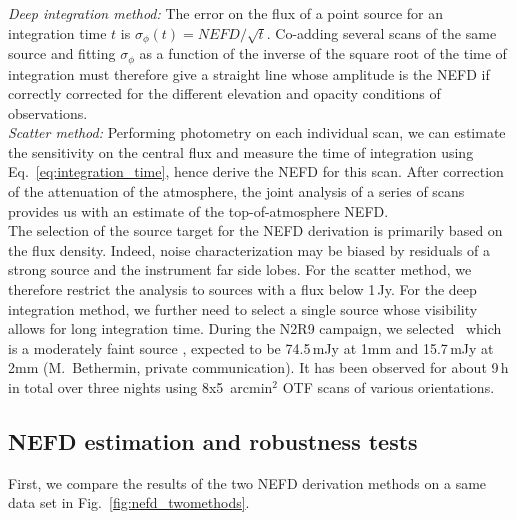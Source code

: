 \noindent \emph{Deep integration method:} The error on the flux of a point source for an
integration time $t$ is $\sigma_\phi(t) = NEFD/\sqrt{t}$. Co-adding several scans of
the same source and fitting $\sigma_\phi$ as a function of the
inverse of the square root of the
time of integration must therefore give a straight line whose
amplitude is the NEFD if correctly corrected for the different
elevation and opacity conditions of observations.\\

\noindent \emph{Scatter method:} Performing photometry on each
individual scan, we can estimate the sensitivity on the central flux
and measure the time of integration using
Eq.~\ref{eq:integration_time}, hence derive the NEFD for this
scan. After correction of the attenuation of the atmosphere, the joint
analysis of a series of scans provides us with an estimate of the
top-of-atmosphere NEFD. \\

The selection of the source target for the NEFD derivation is
primarily based on the flux density. Indeed, noise
characterization may be biased by residuals of a strong source and the
instrument far side lobes. For the scatter method, we therefore
restrict the analysis to sources with a flux below 1\,Jy. For the deep
integration method, we further need to select a single source whose
visibility allows for long integration time. During the N2R9 campaign,
we selected \hls\, which is a
moderately faint source \citep{hls_combes}, expected to be
74.5\,mJy at 1mm and 15.7\,mJy at 2mm (M.~Bethermin, private
communication). It has been observed for about 9\,h in total over
three nights using 8x5~arcmin$^2$ OTF scans of various orientations. 


\subsection{NEFD estimation and robustness tests}
\label{se:nefd_results}

First, we compare the results of the two NEFD derivation methods on a
same data set in Fig.~\ref{fig:nefd_twomethods}.

